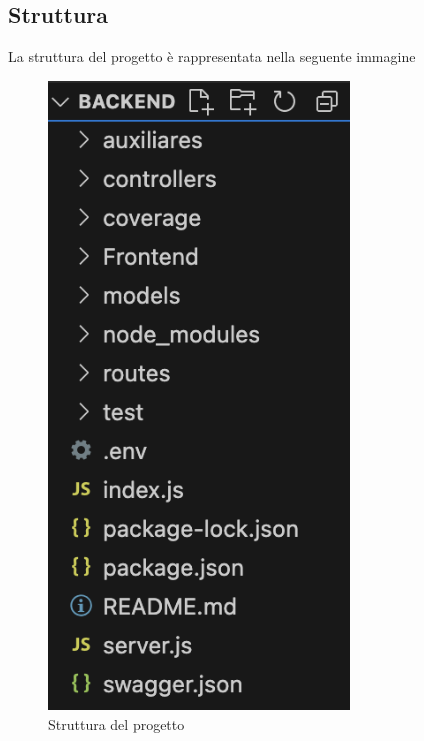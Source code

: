 \documentclass{article}
\begin{document}
\subsection{Struttura}
La struttura del progetto è rappresentata nella seguente immagine
\begin{figure}[H]
    \centering
    \includegraphics[width=80mm]{D4/Images/StrutturaProject.png}
    \caption{Struttura del progetto}
\end{figure}
\end{document}
